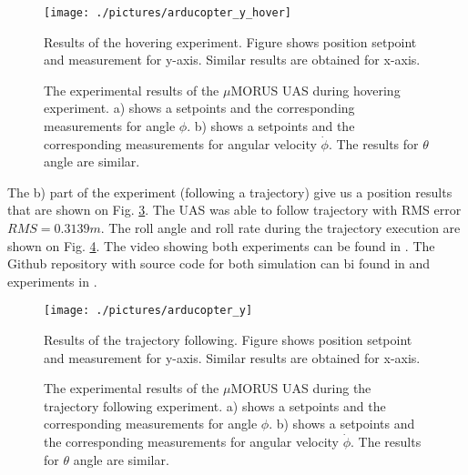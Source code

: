 \begin{figure}[h!]
\centering
\texttt{[image: ./pictures/arducopter\_y\_hover]}
\caption{Results of the hovering experiment. Figure shows position setpoint and measurement for y-axis. Similar results are obtained for x-axis.}
\label{fig:position_hover}
\end{figure} 

\begin{figure}[h!]
  \centering
  \hfill
  \caption{The experimental results of the $\mu$MORUS UAS during hovering experiment. a) shows a setpoints and the corresponding measurements for angle $\phi$. b) shows a setpoints and the corresponding measurements for angular velocity $\dot{\phi}$. The results for $\theta$ angle are similar.}
  \label{fig:roll_hover}
\end{figure}

The b) part of the experiment (following a trajectory) give us a position results that are shown on Fig. \ref{fig:experiment_position}. The UAS was able to follow trajectory with RMS error $RMS = 0.3139 m$. The roll angle and roll rate during the trajectory execution are shown on Fig. \ref{fig:experiment_roll}. The video showing both experiments can be found in \cite{uMORUS2017video}. The Github repository with source code for both simulation can bi found in \cite{letaci2017} and experiments in \cite{letaciPixhawk2017}.

\begin{figure}[h!]
\centering
\texttt{[image: ./pictures/arducopter\_y]}
\caption{Results of the trajectory following. Figure shows position setpoint and measurement for y-axis. Similar results are obtained for x-axis.}
\label{fig:experiment_position}
\end{figure}


\begin{figure}[h!]
  \centering
  \hfill
  \caption{The experimental results of the $\mu$MORUS UAS during the trajectory following experiment. a) shows a setpoints and the corresponding measurements for angle $\phi$. b) shows a setpoints and the corresponding measurements for angular velocity $\dot{\phi}$. The results for $\theta$ angle are similar.}
  \label{fig:experiment_roll}
\end{figure}
